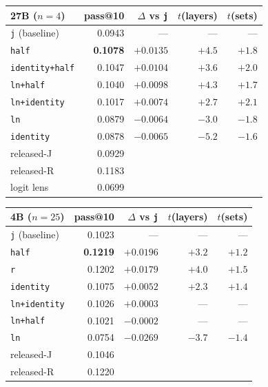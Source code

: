 \documentclass[11pt,a4paper]{article}
\newcommand{\cfg}[1]{\texttt{#1}}
\begin{document}
\begin{center}
\begin{tabular}{@{}lrrrr@{}}
\toprule
\textbf{27B ($n=4$)} & \textbf{pass@10} & \textbf{$\Delta$ vs \cfg{j}} & \textbf{$t$(layers)} & \textbf{$t$(sets)} \\
\midrule
\cfg{j} (baseline) & 0.0943 & --- & --- & --- \\
\cfg{half}          & \textbf{0.1078} & $\mathbf{+0.0135}$ & $+4.5$ & $+1.8$ \\
\cfg{identity+half} & 0.1047 & $+0.0104$ & $+3.6$ & $+2.0$ \\
\cfg{ln+half}       & 0.1040 & $+0.0098$ & $+4.3$ & $+1.7$ \\
\cfg{ln+identity}   & 0.1017 & $+0.0074$ & $+2.7$ & $+2.1$ \\
\cfg{ln}            & 0.0879 & $-0.0064$ & $-3.0$ & $-1.8$ \\
\cfg{identity}      & 0.0878 & $-0.0065$ & $-5.2$ & $-1.6$ \\
\midrule
released-J & 0.0929 & & & \\
released-R & 0.1183 & & & \\
logit lens & 0.0699 & & & \\
\bottomrule
\end{tabular}
\end{center}

\begin{center}
\begin{tabular}{@{}lrrrr@{}}
\toprule
\textbf{4B ($n=25$)} & \textbf{pass@10} & \textbf{$\Delta$ vs \cfg{j}} & \textbf{$t$(layers)} & \textbf{$t$(sets)} \\
\midrule
\cfg{j} (baseline) & 0.1023 & --- & --- & --- \\
\cfg{half}        & \textbf{0.1219} & $\mathbf{+0.0196}$ & $+3.2$ & $+1.2$ \\
\cfg{r}           & 0.1202 & $+0.0179$ & $+4.0$ & $+1.5$ \\
\cfg{identity}    & 0.1075 & $+0.0052$ & $+2.3$ & $+1.4$ \\
\cfg{ln+identity} & 0.1026 & $+0.0003$ & --- & --- \\
\cfg{ln+half}     & 0.1021 & $-0.0002$ & --- & --- \\
\cfg{ln}          & 0.0754 & $-0.0269$ & $-3.7$ & $-1.4$ \\
\midrule
released-J & 0.1046 & & & \\
released-R & 0.1220 & & & \\
\bottomrule
\end{tabular}
\end{center}
\end{document}
